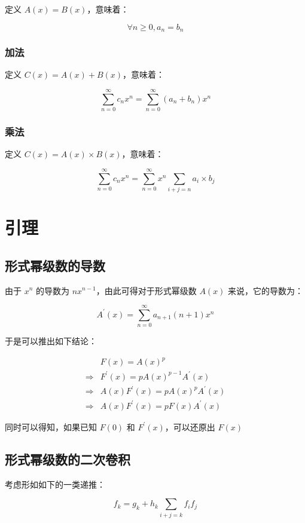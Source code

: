 \documentclass[UTF8]{article}
\begin{document}
定义 $A(x)=B(x)$，意味着：

$$
\forall n \ge 0,a_n=b_n
$$

\subsubsection{加法}

定义 $C(x)=A(x)+B(x)$，意味着：

$$
\sum_{n=0}^{\infty}c_nx^n=\sum_{n=0}^{\infty}(a_n+b_n)x^n
$$

\subsubsection{乘法}

定义 $C(x)=A(x) \times B(x)$，意味着：

$$
\sum_{n=0}^{\infty}c_nx^n=\sum_{n=0}^{\infty}x^n \sum_{i+j=n} a_i \times b_j
$$

\section{引理}

\subsection{形式幂级数的导数}

由于 $x^n$ 的导数为 $nx^{n-1}$，由此可得对于形式幂级数 $A(x)$ 来说，它的导数为：

$$
A ^\prime (x)=\sum_{n=0}^{\infty} a_{n+1}(n+1)x^n
$$

于是可以推出如下结论：

$$
\begin{aligned}
    & F(x)=A(x)^{p} \\
    \Rightarrow & F ^\prime (x)=pA(x)^{p-1}A ^\prime (x) \\
    \Rightarrow & A(x)F ^\prime (x)=pA(x)^pA ^\prime (x) \\
    \Rightarrow & A(x)F ^\prime (x)=pF(x)A ^\prime (x)
\end{aligned}
$$

同时可以得知，如果已知 $F(0)$ 和 $F ^\prime (x)$，可以还原出 $F(x)$

\subsection{形式幂级数的二次卷积}

考虑形如如下的一类递推：

$$
f_k=g_k+h_k\sum_{i+j=k}f_if_j
$$
\end{document}
